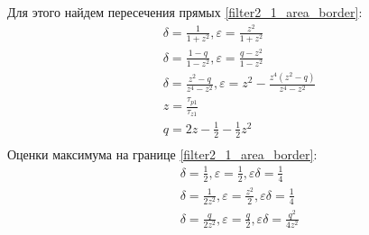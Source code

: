 \documentclass[a4paper,14pt]{extarticle} %
\begin{document}
 Для этого найдем пересечения прямых \eqref{filter2_1_area_border}:
  \begin{equation}
 \begin{aligned}
&\delta = \frac{1}{1+z^2}, \varepsilon = \frac{z^2}{1+z^2}\\
&\delta = \frac{1-q}{1-z^2}, \varepsilon = \frac{q-z^2}{1-z^2}\\
&\delta = \frac{z^2-q}{z^4-z^2}, \varepsilon = z^2 - \frac{z^4(z^2-q)}{z^4-z^2}\\
&z = \frac{\tau_{p1}}{\tau_{z1}}\\
&q = 2z - \frac{1}{2} - \frac{1}{2}z^2\\
 \end{aligned}
\end{equation}
Оценки максимума на границе \eqref{filter2_1_area_border}:
  \begin{equation}
 \begin{aligned}
&\delta = \frac{1}{2}, \varepsilon = \frac{1}{2}, \varepsilon\delta = \frac{1}{4}\\
&\delta = \frac{1}{2z^2}, \varepsilon = \frac{z^2}{2}, \varepsilon\delta = \frac{1}{4}\\
&\delta = \frac{q}{2z^2}, \varepsilon = \frac{q}{2}, \varepsilon\delta = \frac{q^2}{4z^2}\\
 \end{aligned}
\end{equation}
\end{document}
